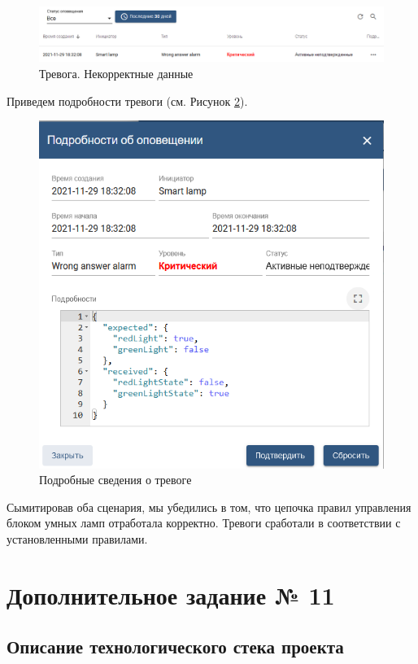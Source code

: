 \documentclass[a4paper,14pt]{extarticle}
\begin{document}
\begin{figure}[h!]
	\centering
	\includegraphics[width=1\linewidth]{images/t2-alarm-wrong-response}
	\caption{Тревога. Некорректные данные}
	\label{fig:t2-alarm-wrong-response}
\end{figure}

Приведем подробности тревоги (см. Рисунок \ref{fig:t2-alarm-wrong-response-detail}).
\begin{figure}[h!]
	\centering
	\includegraphics[width=0.7\linewidth]{images/t2-alarm-wrong-response-detail}
	\caption{Подробные сведения о тревоге}
	\label{fig:t2-alarm-wrong-response-detail}
\end{figure}

Сымитировав оба сценария, мы убедились в том, что цепочка правил управления блоком умных ламп отработала корректно. Тревоги сработали в соответствии с установленными правилами.

\section{Дополнительное задание № 11}

\subsection{Описание технологического стека проекта}
\end{document}
